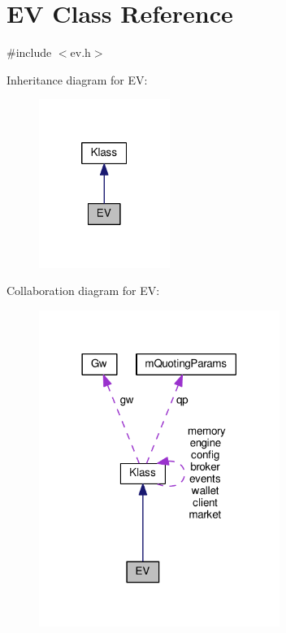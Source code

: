 \hypertarget{class_k_1_1_e_v}{}\section{EV Class Reference}
\label{class_k_1_1_e_v}


{\ttfamily \#include $<$ev.\+h$>$}



Inheritance diagram for EV\+:
\nopagebreak
\begin{figure}[H]
\begin{center}
\leavevmode
\includegraphics[width=121pt]{class_k_1_1_e_v__inherit__graph}
\end{center}
\end{figure}


Collaboration diagram for EV\+:
\nopagebreak
\begin{figure}[H]
\begin{center}
\leavevmode
\includegraphics[width=222pt]{class_k_1_1_e_v__coll__graph}
\end{center}
\end{figure}

